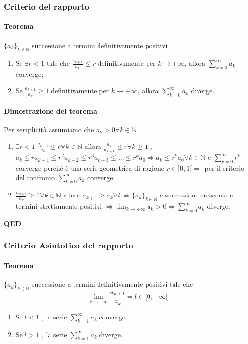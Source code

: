 \documentclass{article}
\newcommand{\N}{\mathbb{N}}
\begin{document}
\subsubsection{{Criterio del rapporto}}
\paragraph{{Teorema}}
$\{a_k \}_{k \in \N}$ successione a termini definitivamente positivi 
\begin{enumerate}
    \item Se $\exists r< 1 $ tale che $\frac{a_{k+1}}{a_k} \leq r$ definitivamente per $ k \rightarrow +\infty$, allora $\sum_{k=0}^{\infty} a_k $ converge;
    \item Se $\frac{a_{k+1}}{a_k} \geq 1$ definitivamente per $ k\rightarrow +\infty$, allora $\sum_{k=0}^{\infty} a_k $ diverge.
\end{enumerate}

\paragraph{{Dimostrazione del teorema}}
Per semplicità assumiamo che $a_k > 0 \forall k \in \N$
\begin{enumerate}
    \item $\exists r < 1 | \frac{a_{k+1}}{a_k} \leq r \forall k \in \N$ allora $\frac{a_k}{a_{k-1}} \leq r \forall k \geq 1$ , $ a_k \leq ra_{k-1} \leq r^2 a_{k-2} \leq r^3 a_{k-3} \leq ... \leq r^k a_0 \Rightarrow a_k \leq r^k a_0 \forall k \in \N$ e $\sum_{k=0}^{\infty} r^k$ converge perché è una serie geometrica di ragione $ r \in ]0,1[ \Rightarrow$ per il criterio del confronto $\sum_{k=0}^{\infty} a_k$ converge.
    
    \item $\frac{a_{k+1}}{a_k} \geq 1 \forall k \in \N$ allora $a_{k+1} \geq a_k \forall k \Rightarrow \{ a_k\}_{k \in \N}$ è successione crescente a termini strettamente positivi $\Rightarrow\lim_{k \rightarrow+\infty} a_k > 0 \Rightarrow \sum_{k=0}^{\infty} a_k$ diverge.   
\end{enumerate}
\begin{flushright}
\textbf{QED}
\end{flushright}

\subsubsection{{Criterio Asintotico del rapporto}}
\paragraph{{Teorema}}
$\{a_k\}_{k\in \N}$ successione a termini definitivamente positivi tale che 
\begin{equation*}
    \lim_{k \rightarrow +\infty} \frac{a_{k+1}}{a_k} = l \in [0,+\infty[
\end{equation*}
\begin{enumerate}
    \item Se $l<1$ , la serie $\sum_{k=1}^{\infty} a_k$ converge.
    \item Se $l> 1$ , la serie $\sum_{k=1}^{\infty} a_k$ diverge.
\end{enumerate}
\end{document}
